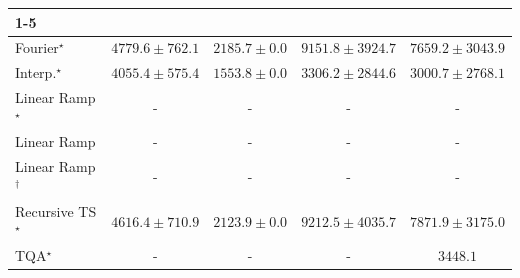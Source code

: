 \begin{tabular}{l|cccc|}
\cline{1-5}
\multicolumn{5}{c}{\rule{0pt}{8pt}SV} \\
\midrule
Fourier$^\star$ & {\cellcolor[HTML]{94B6D7}} \color[HTML]{000000} $4779.6\pm 762.1$ & {\cellcolor[HTML]{F2ECF5}} \color[HTML]{000000} $2185.7\pm 0.0$ & {\cellcolor[HTML]{023A5B}} \color[HTML]{F1F1F1} $9151.8\pm 3924.7$ & {\cellcolor[HTML]{0567A2}} \color[HTML]{F1F1F1} $7659.2\pm 3043.9$ \\
Interp.$^\star$ & {\cellcolor[HTML]{B7C5DF}} \color[HTML]{000000} $4055.4\pm 575.4$ & {\cellcolor[HTML]{FFF7FB}} \color[HTML]{000000} $1553.8\pm 0.0$ & {\cellcolor[HTML]{D5D5E8}} \color[HTML]{000000} $3306.2\pm 2844.6$ & {\cellcolor[HTML]{DEDCEC}} \color[HTML]{000000} $3000.7\pm 2768.1$ \\
Linear Ramp$^\star$ & {\cellcolor[HTML]{000000}} \color[HTML]{F1F1F1} {\cellcolor{white}} \color{black} - & {\cellcolor[HTML]{000000}} \color[HTML]{F1F1F1} {\cellcolor{white}} \color{black} - & {\cellcolor[HTML]{000000}} \color[HTML]{F1F1F1} {\cellcolor{white}} \color{black} - & {\cellcolor[HTML]{000000}} \color[HTML]{F1F1F1} {\cellcolor{white}} \color{black} - \\
Linear Ramp & {\cellcolor[HTML]{000000}} \color[HTML]{F1F1F1} {\cellcolor{white}} \color{black} - & {\cellcolor[HTML]{000000}} \color[HTML]{F1F1F1} {\cellcolor{white}} \color{black} - & {\cellcolor[HTML]{000000}} \color[HTML]{F1F1F1} {\cellcolor{white}} \color{black} - & {\cellcolor[HTML]{000000}} \color[HTML]{F1F1F1} {\cellcolor{white}} \color{black} - \\
Linear Ramp$^\dagger$ & {\cellcolor[HTML]{000000}} \color[HTML]{F1F1F1} {\cellcolor{white}} \color{black} - & {\cellcolor[HTML]{000000}} \color[HTML]{F1F1F1} {\cellcolor{white}} \color{black} - & {\cellcolor[HTML]{000000}} \color[HTML]{F1F1F1} {\cellcolor{white}} \color{black} - & {\cellcolor[HTML]{000000}} \color[HTML]{F1F1F1} {\cellcolor{white}} \color{black} - \\
Recursive TS$^\star$ & {\cellcolor[HTML]{9CB9D9}} \color[HTML]{000000} $4616.4\pm 710.9$ & {\cellcolor[HTML]{F4EDF6}} \color[HTML]{000000} $2123.9\pm 0.0$ & {\cellcolor[HTML]{023858}} \color[HTML]{F1F1F1} $9212.5\pm 4035.7$ & {\cellcolor[HTML]{04629A}} \color[HTML]{F1F1F1} $7871.9\pm 3175.0$ \\
TQA$^\star$ & {\cellcolor[HTML]{000000}} \color[HTML]{F1F1F1} {\cellcolor{white}} \color{black} - & {\cellcolor[HTML]{000000}} \color[HTML]{F1F1F1} {\cellcolor{white}} \color{black} - & {\cellcolor[HTML]{000000}} \color[HTML]{F1F1F1} {\cellcolor{white}} \color{black} - & {\cellcolor[HTML]{D1D2E6}} \color[HTML]{000000} $3448.1$ \\

\end{tabular}
